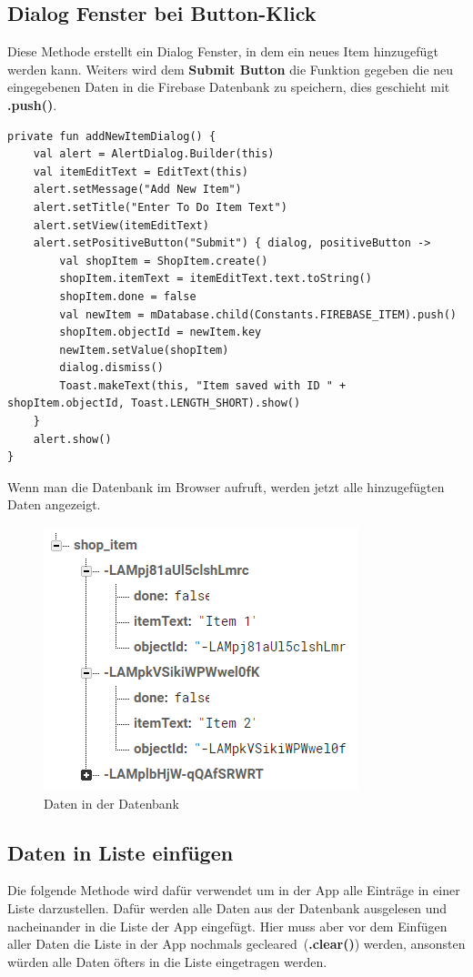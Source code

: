 \subsection{Dialog Fenster bei Button-Klick}
Diese Methode erstellt ein Dialog Fenster, in dem ein neues Item hinzugefügt werden kann. Weiters wird dem \textbf{Submit Button} die Funktion gegeben die neu eingegebenen Daten in die Firebase Datenbank zu speichern, dies geschieht mit \textbf{.push()}. 

\begin{lstlisting}
private fun addNewItemDialog() {
	val alert = AlertDialog.Builder(this)
	val itemEditText = EditText(this)
	alert.setMessage("Add New Item")
	alert.setTitle("Enter To Do Item Text")
	alert.setView(itemEditText)
	alert.setPositiveButton("Submit") { dialog, positiveButton ->
		val shopItem = ShopItem.create()
		shopItem.itemText = itemEditText.text.toString()
		shopItem.done = false
		val newItem = mDatabase.child(Constants.FIREBASE_ITEM).push()
		shopItem.objectId = newItem.key
		newItem.setValue(shopItem)
		dialog.dismiss()
		Toast.makeText(this, "Item saved with ID " + shopItem.objectId, Toast.LENGTH_SHORT).show()
	}
	alert.show()
}
\end{lstlisting}

Wenn man die Datenbank im Browser aufruft, werden jetzt alle hinzugefügten Daten angezeigt.

\begin{figure}[!h]
	\begin{center}
		\includegraphics[width=0.5\linewidth]{images/database-entry.png}
		\caption{Daten in der Datenbank}
	\end{center}
\end{figure}

\subsection{Daten in Liste einfügen}
Die folgende Methode wird dafür verwendet um in der App alle Einträge in einer Liste darzustellen. Dafür werden alle Daten aus der Datenbank ausgelesen und nacheinander in die Liste der App eingefügt. Hier muss aber vor dem Einfügen aller Daten die Liste in der App nochmals \glqq gecleared\grqq \ (\textbf{.clear()}) werden, ansonsten würden alle Daten öfters in die Liste eingetragen werden.



